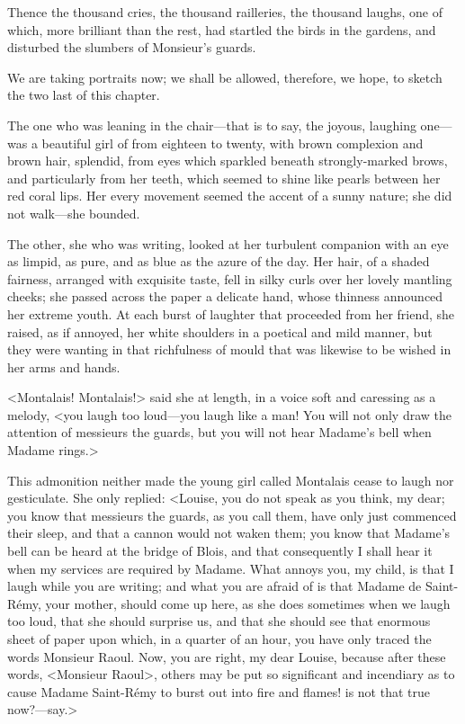 Thence the thousand cries, the thousand railleries, the thousand laughs, one of which, more brilliant than the rest, had startled the birds in the gardens, and disturbed the slumbers of Monsieur's guards.

We are taking portraits now; we shall be allowed, therefore, we hope, to sketch the two last of this chapter.

The one who was leaning in the chair—that is to say, the joyous, laughing one—was a beautiful girl of from eighteen to twenty, with brown complexion and brown hair, splendid, from eyes which sparkled beneath strongly-marked brows, and particularly from her teeth, which seemed to shine like pearls between her red coral lips. Her every movement seemed the accent of a sunny nature; she did not walk—she bounded.

The other, she who was writing, looked at her turbulent companion with an eye as limpid, as pure, and as blue as the azure of the day. Her hair, of a shaded fairness, arranged with exquisite taste, fell in silky curls over her lovely mantling cheeks; she passed across the paper a delicate hand, whose thinness announced her extreme youth. At each burst of laughter that proceeded from her friend, she raised, as if annoyed, her white shoulders in a poetical and mild manner, but they were wanting in that richfulness of mould that was likewise to be wished in her arms and hands.

<Montalais! Montalais!> said she at length, in a voice soft and caressing as a melody, <you laugh too loud—you laugh like a man! You will not only draw the attention of messieurs the guards, but you will not hear Madame's bell when Madame rings.>

This admonition neither made the young girl called Montalais cease to laugh nor gesticulate. She only replied: <Louise, you do not speak as you think, my dear; you know that messieurs the guards, as you call them, have only just commenced their sleep, and that a cannon would not waken them; you know that Madame's bell can be heard at the bridge of Blois, and that consequently I shall hear it when my services are required by Madame. What annoys you, my child, is that I laugh while you are writing; and what you are afraid of is that Madame de Saint-Rémy, your mother, should come up here, as she does sometimes when we laugh too loud, that she should surprise us, and that she should see that enormous sheet of paper upon which, in a quarter of an hour, you have only traced the words Monsieur Raoul. Now, you are right, my dear Louise, because after these words, <Monsieur Raoul>, others may be put so significant and incendiary as to cause Madame Saint-Rémy to burst out into fire and flames!  is not that true now?—say.>


